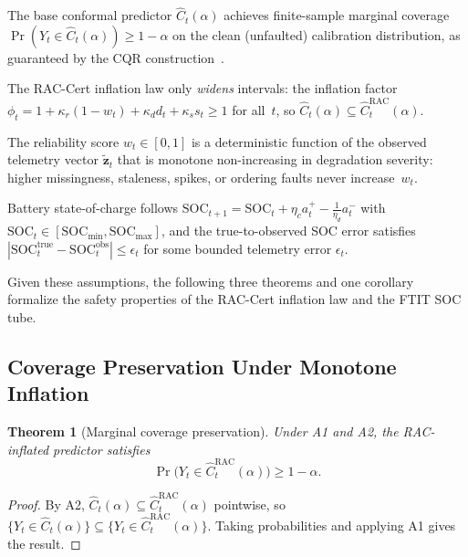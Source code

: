 \documentclass[11pt,a4paper]{article}
\newtheorem{theorem}{Theorem}
\begin{document}
\begin{description}[leftmargin=1em,topsep=2pt,itemsep=1pt]
  \item[\textbf{A1} (Base calibration).] The base conformal predictor $\hat{C}_t(\alpha)$ achieves finite-sample marginal coverage $\Pr(Y_t \in \hat{C}_t(\alpha)) \ge 1-\alpha$ on the clean (unfaulted) calibration distribution, as guaranteed by the CQR construction~\cite{romano2019conformalized}.
  \item[\textbf{A2} (Monotone inflation).] The RAC-Cert inflation law only \emph{widens} intervals: the inflation factor $\phi_t = 1 + \kappa_r(1-w_t) + \kappa_d d_t + \kappa_s s_t \ge 1$ for all~$t$, so $\hat{C}_t(\alpha) \subseteq \hat{C}_t^{\mathrm{RAC}}(\alpha)$.
  \item[\textbf{A3} (Reliability scoring).] The reliability score $w_t \in [0,1]$ is a deterministic function of the observed telemetry vector $\tilde{\mathbf{z}}_t$ that is monotone non-increasing in degradation severity: higher missingness, staleness, spikes, or ordering faults never increase~$w_t$.
  \item[\textbf{A4} (SOC dynamics).] Battery state-of-charge follows $\mathrm{SOC}_{t+1} = \mathrm{SOC}_t + \eta_c a_t^+ - \frac{1}{\eta_d}a_t^-$ with $\mathrm{SOC}_t \in [\mathrm{SOC}_{\min}, \mathrm{SOC}_{\max}]$, and the true-to-observed SOC error satisfies $|\mathrm{SOC}^{\mathrm{true}}_t - \mathrm{SOC}^{\mathrm{obs}}_t| \le \epsilon_t$ for some bounded telemetry error $\epsilon_t$.
\end{description}

Given these assumptions, the following three theorems and one corollary formalize the safety properties of the RAC-Cert inflation law and the FTIT SOC tube.

\subsection{Coverage Preservation Under Monotone Inflation}

\begin{theorem}[Marginal coverage preservation]\label{thm:rac_coverage}
Under A1 and A2, the RAC-inflated predictor satisfies
\[
  \Pr\!\bigl(Y_t \in \hat{C}_t^{\mathrm{RAC}}(\alpha)\bigr) \ge 1-\alpha.
\]
\end{theorem}
\begin{proof}
By A2, $\hat{C}_t(\alpha) \subseteq \hat{C}_t^{\mathrm{RAC}}(\alpha)$ pointwise, so $\{Y_t \in \hat{C}_t(\alpha)\} \subseteq \{Y_t \in \hat{C}_t^{\mathrm{RAC}}(\alpha)\}$. Taking probabilities and applying A1 gives the result.
\end{proof}
\end{document}
